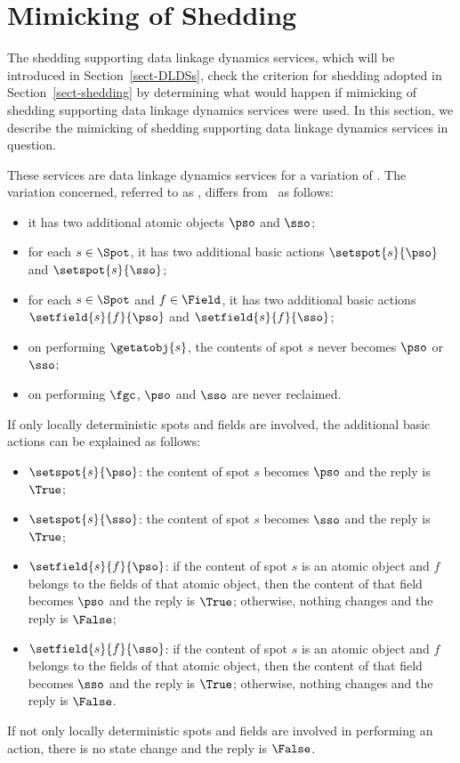 \documentclass[fleqn]{llncs}
\begin{document}
\section{Mimicking of Shedding}
\label{sect-DLDSm}

The shedding supporting data linkage dynamics services, which will be
introduced in Section~\ref{sect-DLDSs}, check the criterion for shedding
adopted in Section~\ref{sect-shedding} by determining what would happen
if mimicking of shedding supporting data linkage dynamics services were
used.
In this section, we describe the mimicking of shedding supporting data
linkage dynamics services in question.

These services are data linkage dynamics services for a variation of
\DLD.
The variation concerned, referred to as \DLDm, differs from \DLD\ as
follows:
\begin{itemize}
\item
it has two additional atomic objects $\pso$ and $\sso$;
\item
for each $s \in \Spot$, it has two additional basic actions
$\setspot{s}{\pso}$ and $\setspot{s}{\sso}$;
\item
for each $s \in \Spot$ and $f \in \Field$, it has two additional basic
actions $\setfield{s}{f}{\pso}$ and $\setfield{s}{f}{\sso}$;
\item
on performing $\getatobj{s}$, the contents of spot $s$ never becomes
$\pso$ or $\sso$;
\item
on performing $\fgc$, $\pso$ and $\sso$ are never reclaimed.
\end{itemize}

If only locally deterministic spots and fields are involved, the
additional basic actions can be explained as follows:
\begin{itemize}
\item
$\setspot{s}{\pso}$:
the content of spot $s$ becomes $\pso$ and the reply is $\True$;
\item
$\setspot{s}{\sso}$:
the content of spot $s$ becomes $\sso$ and the reply is $\True$;
\item
$\setfield{s}{f}{\pso}$:
if the content of spot $s$ is an atomic object and $f$ belongs to the
fields of that atomic object, then the content of that field becomes
$\pso$ and the reply is $\True$; otherwise, nothing changes and the
reply is $\False$;
\item
$\setfield{s}{f}{\sso}$:
if the content of spot $s$ is an atomic object and $f$ belongs to the
fields of that atomic object, then the content of that field becomes
$\sso$ and the reply is $\True$; otherwise, nothing changes and the
reply is $\False$.
\end{itemize}
If not only locally deterministic spots and fields are involved in
performing an action, there is no state change and the reply is
$\False$.
\end{document}
